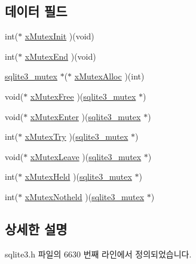 \subsection*{데이터 필드}
\begin{DoxyCompactItemize}
\item 
int($\ast$ \hyperlink{structsqlite3__mutex__methods_a1a163f0e0eaed85223b1537434df635a}{x\+Mutex\+Init} )(void)
\item 
int($\ast$ \hyperlink{structsqlite3__mutex__methods_ab3bc5e370edbeb1db4199d5f609fb09f}{x\+Mutex\+End} )(void)
\item 
\hyperlink{sqlite3_8h_a0f546860bde03fddb33a9fed920da05c}{sqlite3\+\_\+mutex} $\ast$($\ast$ \hyperlink{structsqlite3__mutex__methods_a1c6c36e7f710a5bb8564946595cba324}{x\+Mutex\+Alloc} )(int)
\item 
void($\ast$ \hyperlink{structsqlite3__mutex__methods_a632046a2d4a6372a567a5ac5e8175b30}{x\+Mutex\+Free} )(\hyperlink{sqlite3_8h_a0f546860bde03fddb33a9fed920da05c}{sqlite3\+\_\+mutex} $\ast$)
\item 
void($\ast$ \hyperlink{structsqlite3__mutex__methods_a0237ae1928c2edab7be16e9e007f6a02}{x\+Mutex\+Enter} )(\hyperlink{sqlite3_8h_a0f546860bde03fddb33a9fed920da05c}{sqlite3\+\_\+mutex} $\ast$)
\item 
int($\ast$ \hyperlink{structsqlite3__mutex__methods_aa65a38cee32246dc3257a80ce47be5fe}{x\+Mutex\+Try} )(\hyperlink{sqlite3_8h_a0f546860bde03fddb33a9fed920da05c}{sqlite3\+\_\+mutex} $\ast$)
\item 
void($\ast$ \hyperlink{structsqlite3__mutex__methods_a0d4ef78481d18de5f9346f80321a17b1}{x\+Mutex\+Leave} )(\hyperlink{sqlite3_8h_a0f546860bde03fddb33a9fed920da05c}{sqlite3\+\_\+mutex} $\ast$)
\item 
int($\ast$ \hyperlink{structsqlite3__mutex__methods_a71a26118133388426ddf18ab59ce87f5}{x\+Mutex\+Held} )(\hyperlink{sqlite3_8h_a0f546860bde03fddb33a9fed920da05c}{sqlite3\+\_\+mutex} $\ast$)
\item 
int($\ast$ \hyperlink{structsqlite3__mutex__methods_a5b7c9daa7aea5f01ef9fa58f6d1c5cb1}{x\+Mutex\+Notheld} )(\hyperlink{sqlite3_8h_a0f546860bde03fddb33a9fed920da05c}{sqlite3\+\_\+mutex} $\ast$)
\end{DoxyCompactItemize}


\subsection{상세한 설명}


sqlite3.\+h 파일의 6630 번째 라인에서 정의되었습니다.



